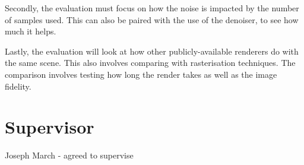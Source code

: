 \documentclass[12pt, a4paper]{article}
\begin{document}
    Secondly, the evaluation must focus on how the noise is impacted by the number of samples used. This can also be paired with the use of the denoiser, to see how much it helps.

    Lastly, the evaluation will look at how other publicly-available renderers do with the same scene. This also involves comparing with rasterisation techniques. The comparison involves testing how long the render takes as well as the image fidelity.

    \section*{Supervisor}
    Joseph March - agreed to supervise
\end{document}
